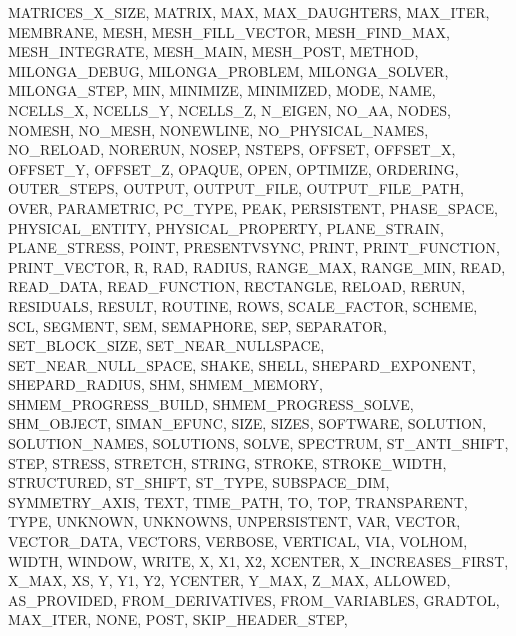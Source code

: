 {{      MATRICES_X_SIZE,
      MATRIX,
      MAX,
      MAX_DAUGHTERS,
      MAX_ITER,
      MEMBRANE,
      MESH,
      MESH_FILL_VECTOR,
      MESH_FIND_MAX,
      MESH_INTEGRATE,
      MESH_MAIN,
      MESH_POST,
      METHOD,
      MILONGA_DEBUG,
      MILONGA_PROBLEM,
      MILONGA_SOLVER,
      MILONGA_STEP,
      MIN,
      MINIMIZE,
      MINIMIZED,
      MODE,
      NAME,
      NCELLS_X,
      NCELLS_Y,
      NCELLS_Z,
      N_EIGEN,
      NO_AA,
      NODES,
      NOMESH,
      NO_MESH,
      NONEWLINE,
      NO_PHYSICAL_NAMES,
      NO_RELOAD,
      NORERUN,
      NOSEP,
      NSTEPS,
      OFFSET,
      OFFSET_X,
      OFFSET_Y,
      OFFSET_Z,
      OPAQUE,
      OPEN,
      OPTIMIZE,
      ORDERING,
      OUTER_STEPS,
      OUTPUT,
      OUTPUT_FILE,
      OUTPUT_FILE_PATH,
      OVER,
      PARAMETRIC,
      PC_TYPE,
      PEAK,
      PERSISTENT,
      PHASE_SPACE,
      PHYSICAL_ENTITY,
      PHYSICAL_PROPERTY,
      PLANE_STRAIN,
      PLANE_STRESS,
      POINT,
      PRESENTVSYNC,
      PRINT,
      PRINT_FUNCTION,
      PRINT_VECTOR,
      R,
      RAD,
      RADIUS,
      RANGE_MAX,
      RANGE_MIN,
      READ,
      READ_DATA,
      READ_FUNCTION,
      RECTANGLE,
      RELOAD,
      RERUN,
      RESIDUALS,
      RESULT,
      ROUTINE,
      ROWS,
      SCALE_FACTOR,
      SCHEME,
      SCL,
      SEGMENT,
      SEM,
      SEMAPHORE,
      SEP,
      SEPARATOR,
      SET_BLOCK_SIZE,
      SET_NEAR_NULLSPACE,
      SET_NEAR_NULL_SPACE,
      SHAKE,
      SHELL,
      SHEPARD_EXPONENT,
      SHEPARD_RADIUS,
      SHM,
      SHMEM_MEMORY,
      SHMEM_PROGRESS_BUILD,
      SHMEM_PROGRESS_SOLVE,
      SHM_OBJECT,
      SIMAN_EFUNC,
      SIZE,
      SIZES,
      SOFTWARE,
      SOLUTION,
      SOLUTION_NAMES,
      SOLUTIONS,
      SOLVE,
      SPECTRUM,
      ST_ANTI_SHIFT,
      STEP,
      STRESS,
      STRETCH,
      STRING,
      STROKE,
      STROKE_WIDTH,
      STRUCTURED,
      ST_SHIFT,
      ST_TYPE,
      SUBSPACE_DIM,
      SYMMETRY_AXIS,
      TEXT,
      TIME_PATH,
      TO,
      TOP,
      TRANSPARENT,
      TYPE,
      UNKNOWN,
      UNKNOWNS,
      UNPERSISTENT,
      VAR,
      VECTOR,
      VECTOR_DATA,
      VECTORS,
      VERBOSE,
      VERTICAL,
      VIA,
      VOLHOM,
      WIDTH,
      WINDOW,
      WRITE,
      X,
      X1,
      X2,
      XCENTER,
      X_INCREASES_FIRST,
      X_MAX,
      XS,
      Y,
      Y1,
      Y2,
      YCENTER,
      Y_MAX,
      Z_MAX,
      ALLOWED,
      AS_PROVIDED,
      FROM_DERIVATIVES,
      FROM_VARIABLES,
      GRADTOL,
      MAX_ITER,
      NONE,
      POST,
      SKIP_HEADER_STEP,
}}
